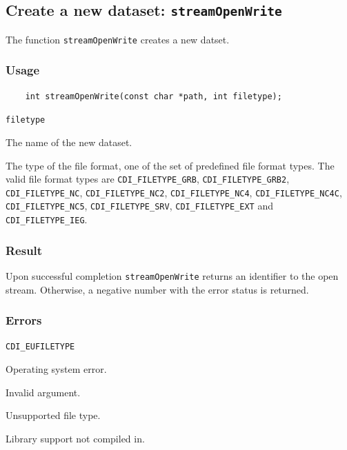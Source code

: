 

\subsection{Create a new dataset: \texttt{streamOpenWrite}}
\label{streamOpenWrite}

The function {\texttt{streamOpenWrite}} creates a new datset.
\subsubsection*{Usage}

\begin{verbatim}
    int streamOpenWrite(const char *path, int filetype);
\end{verbatim}

\hspace*{4mm}\begin{minipage}[]{15cm}
\begin{deflist}{\texttt{filetype}\ }
\item[\texttt{path}]
The name of the new dataset.
\item[\texttt{filetype}]
The type of the file format, one of the set of predefined {\CDI} file format types.
                     The valid {\CDI} file format types are {\texttt{CDI\_FILETYPE\_GRB}}, {\texttt{CDI\_FILETYPE\_GRB2}}, {\texttt{CDI\_FILETYPE\_NC}},
                     {\texttt{CDI\_FILETYPE\_NC2}}, {\texttt{CDI\_FILETYPE\_NC4}}, {\texttt{CDI\_FILETYPE\_NC4C}}, {\texttt{CDI\_FILETYPE\_NC5}},
{\texttt{CDI\_FILETYPE\_SRV}},
                     {\texttt{CDI\_FILETYPE\_EXT}} and {\texttt{CDI\_FILETYPE\_IEG}}.

\end{deflist}
\end{minipage}

\subsubsection*{Result}

Upon successful completion {\texttt{streamOpenWrite}} returns an identifier to the
open stream. Otherwise, a negative number with the error status is returned.


\subsubsection*{Errors}


\hspace*{4mm}\begin{minipage}[]{15cm}
\begin{deflist}{\texttt{CDI\_EUFILETYPE}\ }
\item[\texttt{CDI\_ESYSTEM}]
Operating system error.
\item[\texttt{CDI\_EINVAL}]
Invalid argument.
\item[\texttt{CDI\_EUFILETYPE}]
Unsupported file type.
\item[\texttt{CDI\_ELIBNAVAIL}]
Library support not compiled in.
\end{deflist}
\end{minipage}


